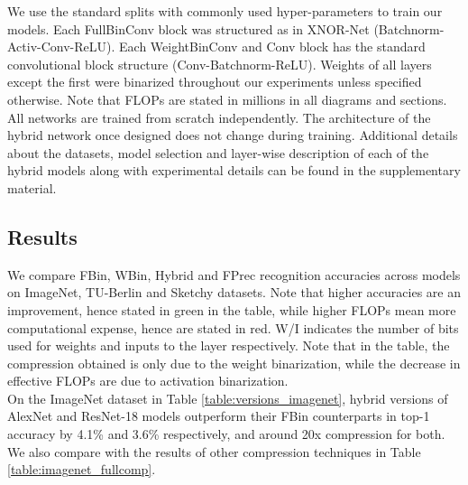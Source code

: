 \noindent We use the standard splits with commonly used hyper-parameters to train our models. Each FullBinConv block was structured as in XNOR-Net (Batchnorm-Activ-Conv-ReLU). Each WeightBinConv and Conv block has the standard convolutional block structure (Conv-Batchnorm-ReLU). Weights of all layers except the first were binarized throughout our experiments unless specified otherwise. Note that FLOPs are stated in millions in all diagrams and sections. All networks are trained from scratch independently. The architecture of the hybrid network once designed does not change during training. Additional details about the datasets, model selection and layer-wise description of each of the hybrid models along with experimental details can be found in the supplementary material. 

\subsection{Results}

\noindent We compare FBin, WBin, Hybrid and FPrec recognition accuracies across models on ImageNet, TU-Berlin and Sketchy datasets. Note that higher accuracies are an improvement, hence stated in green in the table, while higher FLOPs mean more computational expense, hence are stated in red. W/I indicates the number of bits used for weights and inputs to the layer respectively. Note that in the table, the compression obtained is only due to the weight binarization, while the decrease in effective FLOPs are due to activation binarization.\\

\noindent On the ImageNet dataset in Table \ref{table:versions_imagenet}, hybrid versions of AlexNet and ResNet-18 models outperform their FBin counterparts in top-1 accuracy by 4.1\% and 3.6\% respectively, and around 20x compression for both. We also compare with the results of other compression techniques in Table \ref{table:imagenet_fullcomp}.\\

